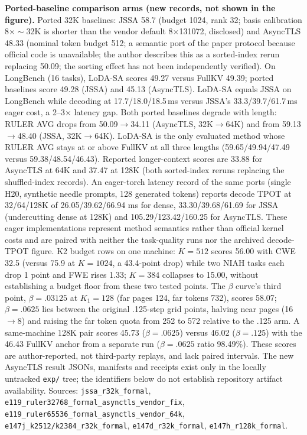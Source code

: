 \documentclass[10pt,letterpaper]{article}
\begin{document}
\par\medskip\noindent\textbf{Ported-baseline comparison arms (new records, not shown in the figure).} Ported 32K baselines: JSSA 58.7 (budget 1024, rank 32; basis calibration 8$\times\sim$32K is shorter than the vendor default 8$\times$131072, disclosed) and AsyncTLS 48.33 (nominal token budget 512; a semantic port of the paper protocol because official code is unavailable; the author describes this as a sorted-index rerun replacing 50.09; the sorting effect has not been independently verified). On LongBench (16 tasks), LoDA-SA scores 49.27 versus FullKV 49.39; ported baselines score 49.28 (JSSA) and 45.13 (AsyncTLS). LoDA-SA equals JSSA on LongBench while decoding at 17.7/18.0/18.5\,ms versus JSSA's 33.3/39.7/61.7\,ms eager cost, a 2--3$\times$ latency gap. Both ported baselines degrade with length: RULER AVG drops from 50.09$\rightarrow$34.11 (AsyncTLS, 32K$\rightarrow$64K) and from 59.13$\rightarrow$48.40 (JSSA, 32K$\rightarrow$64K). LoDA-SA is the only evaluated method whose RULER AVG stays at or above FullKV at all three lengths (59.65/49.94/47.49 versus 59.38/48.54/46.43). Reported longer-context scores are 33.88 for AsyncTLS at 64K and 37.47 at 128K (both sorted-index reruns replacing the shuffled-index records). An eager-torch latency record of the same ports (single H20, synthetic needle prompts, 128 generated tokens) reports decode TPOT at 32/64/128K of 26.05/39.62/66.94 ms for dense, 33.30/39.68/61.69 for JSSA (undercutting dense at 128K) and 105.29/123.42/160.25 for AsyncTLS. These eager implementations represent method semantics rather than official kernel costs and are paired with neither the task-quality runs nor the archived decode-TPOT figure. K2 budget rows on one machine: $K=512$ scores 56.00 with CWE 32.5 (versus 75.9 at $K=1024$, a 43.4-point drop) while two NIAH tasks each drop 1 point and FWE rises 1.33; $K=384$ collapses to 15.00, without establishing a budget floor from these two tested points. The $\beta$ curve's third point, $\beta=.03125$ at $K_1=128$ (far pages 124, far tokens 732), scores 58.07; $\beta=.0625$ lies between the original .125-step grid points, halving near pages (16$\rightarrow$8) and raising the far token quota from 252 to 572 relative to the .125 arm. A same-machine 128K pair scores 45.73 ($\beta=.0625$) versus 46.02 ($\beta=.125$) with the 46.43 FullKV anchor from a separate run ($\beta=.0625$ ratio 98.49\%). These scores are author-reported, not third-party replays, and lack paired intervals. The new AsyncTLS result JSONs, manifests and receipts exist only in the locally untracked \texttt{exp/} tree; the identifiers below do not establish repository artifact availability. Sources: \texttt{jssa\_\allowbreak r32k\_\allowbreak formal}, \texttt{e119\_\allowbreak ruler32768\_\allowbreak formal\_\allowbreak asynctls\_\allowbreak vendor\_\allowbreak fix}, \texttt{e119\_\allowbreak ruler65536\_\allowbreak formal\_\allowbreak asynctls\_\allowbreak vendor\_\allowbreak 64k}, \texttt{e147j\_\allowbreak k2512/\allowbreak k2384\_\allowbreak r32k\_\allowbreak formal}, \texttt{e147d\_\allowbreak r32k\_\allowbreak formal}, \texttt{e147h\_\allowbreak r128k\_\allowbreak formal}.
\end{document}
